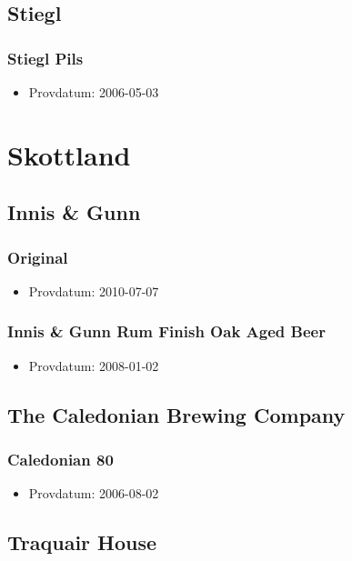\documentclass[11pt]{article}
\begin{document}
\subsection{Stiegl}
\label{sec:orgdd9627f}
\subsubsection{Stiegl Pils}
\label{sec:org2e589a7}
\begin{itemize}
\item Provdatum: 2006-05-03
\end{itemize}
\section{Skottland}
\label{sec:org56ca75a}
\subsection{Innis \& Gunn}
\label{sec:org67914eb}
\subsubsection{Original}
\label{sec:org8f4079c}
\begin{itemize}
\item Provdatum: 2010-07-07
\end{itemize}
\subsubsection{Innis \& Gunn Rum Finish Oak Aged Beer}
\label{sec:org648a1bd}
\begin{itemize}
\item Provdatum: 2008-01-02
\end{itemize}
\subsection{The Caledonian Brewing Company}
\label{sec:org10b245a}
\subsubsection{Caledonian 80}
\label{sec:org32d635b}
\begin{itemize}
\item Provdatum: 2006-08-02
\end{itemize}
\subsection{Traquair House}
\label{sec:org0c52660}
\end{document}
